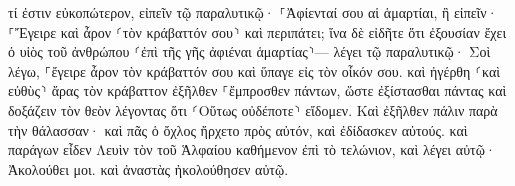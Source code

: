 \documentclass{openreader}
\begin{document}
τί ἐστιν εὐκοπώτερον, εἰπεῖν τῷ παραλυτικῷ· ⸀Ἀφίενταί σου αἱ ἁμαρτίαι, ἢ εἰπεῖν· ⸀Ἔγειρε καὶ ἆρον ⸂τὸν κράβαττόν σου⸃ καὶ περιπάτει; 
ἵνα δὲ εἰδῆτε ὅτι ἐξουσίαν ἔχει ὁ υἱὸς τοῦ ἀνθρώπου ⸂ἐπὶ τῆς γῆς ἀφιέναι ἁμαρτίας⸃— λέγει τῷ παραλυτικῷ· 
Σοὶ λέγω, ⸀ἔγειρε ἆρον τὸν κράβαττόν σου καὶ ὕπαγε εἰς τὸν οἶκόν σου. 
καὶ ἠγέρθη ⸂καὶ εὐθὺς⸃ ἄρας τὸν κράβαττον ἐξῆλθεν ⸀ἔμπροσθεν πάντων, ὥστε ἐξίστασθαι πάντας καὶ δοξάζειν τὸν θεὸν λέγοντας ὅτι ⸂Οὕτως οὐδέποτε⸃ εἴδομεν. 
Καὶ ἐξῆλθεν πάλιν παρὰ τὴν θάλασσαν· καὶ πᾶς ὁ ὄχλος ἤρχετο πρὸς αὐτόν, καὶ ἐδίδασκεν αὐτούς. 
καὶ παράγων εἶδεν Λευὶν τὸν τοῦ Ἁλφαίου καθήμενον ἐπὶ τὸ τελώνιον, καὶ λέγει αὐτῷ· Ἀκολούθει μοι. καὶ ἀναστὰς ἠκολούθησεν αὐτῷ. 
\end{document}
